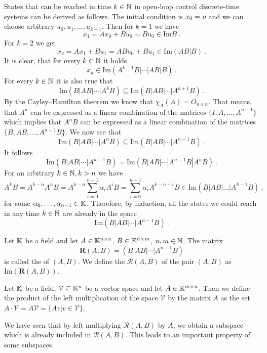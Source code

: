\sloppy
States that can be reached in time $k\in\mathbb{N}$ in open-loop control discrete-time systems can be derived as follows. The initial condition is $x_0=\textit{o}$ and we can choose arbitrary $u_0,u_1,\ldots,u_{k-1}$. Then for $k=1$ we have 
$$x_1=Ax_0+Bu_0=Bu_0 \in \text{Im}B\ .$$
For $k=2$ we get
$$x_2=Ax_1+Bu_1=ABu_0+Bu_1\in\text{Im}(AB|B)\ .$$
It is clear, that for every $k\in\mathbb{N}$ it holds
$$x_k\in\text{Im}(A^{k-1}B|\cdots|AB|B)\ .$$
For every $k\in\mathbb{N}$ it is also true that
$$\text{Im}(B|AB|\cdots|A^kB) \subseteq \text{Im}(B|AB|\cdots|A^{k+1}B)\ .$$
By the Cayley–Hamilton theorem we know that $\chi_A(A)=O_{n\times n}$. That means, that $A^n$ can be expressed as a linear combination of the matrices $\{I,A,\ldots,A^{n-1}\}$ which implies that $A^nB$ can be expressed as a linear combination of the matrices $\{B,AB,\ldots,A^{n-1}B\}$. We now see that $$\text{Im}(B|AB|\cdots|A^{n}B) \subseteq \text{Im}(B|AB|\cdots|A^{n-1}B)\ .$$
It follows
\begin{equation}
\label{eq:cayleHamilReachable}
	\text{Im}(B|AB|\cdots|A^{n-1}B)=\text{Im}(B|AB|\cdots|A^{n-1}B|A^nB)\ .
\end{equation}
For an arbitrary $k\in\mathbb{N},k>n$ we have $$A^kB=A^{k-n}A^nB=A^{k-n}\sum^{n-1}_{i=0}\alpha_i A^iB=\sum^{n-1}_{i=0}\alpha_i A^{k-n+i}B\in\text{Im}(B|AB|\ldots|A^{k-1}B)\ ,$$
for some $\alpha_0,\ldots,\alpha_{n-1}\in\mathbb{K}$.
Therefore, by induction, all the states we could reach in any time $k\in\mathbb{N}$ are already in the space 
$$\text{Im}(B|AB|\cdots|A^{n-1}B)\ .$$
\begin{definition}
	Let $\mathbb{K}$ be a field and let $A \in \mathbb{K}^{n \times n}$, $B \in \mathbb{K}^{n \times m}$, $n,m \in \mathbb{N}$. The matrix $$\mathbf{R}(A,B)=(B|AB|\cdots|A^{n-1}B)$$ is called the  of $(A,B)$. We define the  $\mathcal{R}(A,B)$ of the pair $(A,B)$ as $\text{Im}(\mathbf{R}(A,B))$. 
\end{definition}

\begin{definition}
	Let $\mathbb{K}$ be a field, $\mathcal{V} \subseteq \mathbb{K}^n$ be a vector space and let $A\in\mathbb{K}^{m\times n}$. Then we define the product of the left multiplication of the space $\mathcal{V}$ by the matrix $A$ as the set $A\cdot\mathcal{V}=A\mathcal{V}=\{Av|v\in\mathcal{V}\}$.
\end{definition}

We have seen that by left multiplying $\mathcal{R}(A,B)$ by $A$, we obtain a subspace which is already included in $\mathcal{R}(A,B)$. This leads to an important property of some subspaces.

